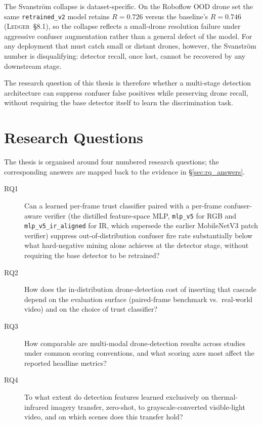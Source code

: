 \documentclass[12pt,a4paper,oneside,openright]{book}
\begin{document}
The Svanstr\"om collapse is dataset-specific. On the Roboflow OOD drone set the same \texttt{retrained\_v2} model retains $R=0.726$ versus the baseline's $R=0.746$ (\textsc{Ledger}~\S8.1), so the collapse reflects a small-drone resolution failure under aggressive confuser augmentation rather than a general defect of the model. For any deployment that must catch small or distant drones, however, the Svanstr\"om number is disqualifying: detector recall, once lost, cannot be recovered by any downstream stage.

The research question of this thesis is therefore whether a multi-stage detection architecture can suppress confuser false positives while preserving drone recall, without requiring the base detector itself to learn the discrimination task.

\section{Research Questions}
\label{sec:rqs}

The thesis is organised around four numbered research questions; the corresponding answers are mapped back to the evidence in \S\ref{sec:rq_answers}.

\begin{description}
    \item[RQ1] Can a learned per-frame trust classifier paired with a per-frame confuser-aware verifier (the distilled feature-space MLP, \texttt{mlp\_v5} for RGB and \texttt{mlp\_v5\_ir\_aligned} for IR, which supersede the earlier MobileNetV3 patch verifier) suppress out-of-distribution confuser fire rate substantially below what hard-negative mining alone achieves at the detector stage, without requiring the base detector to be retrained?
    \item[RQ2] How does the in-distribution drone-detection cost of inserting that cascade depend on the evaluation surface (paired-frame benchmark vs.\ real-world video) and on the choice of trust classifier?
    \item[RQ3] How comparable are multi-modal drone-detection results across studies under common scoring conventions, and what scoring axes most affect the reported headline metrics?
    \item[RQ4] To what extent do detection features learned exclusively on thermal-infrared imagery transfer, zero-shot, to grayscale-converted visible-light video, and on which scenes does this transfer hold?
\end{description}
\end{document}
